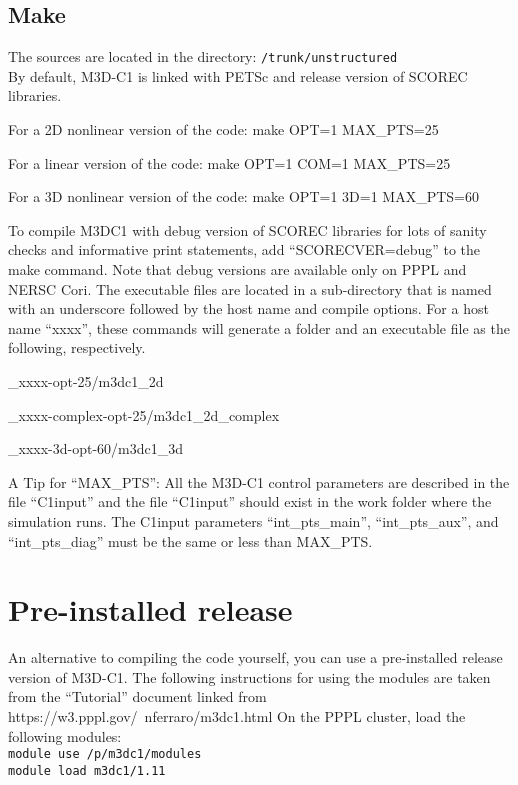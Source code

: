 \subsection{Make}
The sources are located in the directory: \texttt{/trunk/unstructured}
\\
By default, M3D-C1 is linked with PETSc and release version of SCOREC libraries.
\\
\begin{description}
\item 	For a 2D nonlinear version of the code:   	make OPT=1 MAX\_PTS=25
\item	For a linear version of the code:               		make OPT=1 COM=1 MAX\_PTS=25
\item	For a 3D nonlinear version of the code:     	make OPT=1 3D=1 MAX\_PTS=60
\end{description}
To compile M3DC1 with debug version of SCOREC libraries for lots of sanity checks and informative print statements, add “SCORECVER=debug” to the make command. Note that debug versions are available only on PPPL and NERSC Cori.
\newline\newline
The executable files are located in a sub-directory that is named with an underscore followed by the host name and compile options. For a host name “xxxx”, these commands will generate a folder and an executable file as the following, respectively.
\begin{description}
\item \_xxxx-opt-25/m3dc1\_2d
\item	\_xxxx-complex-opt-25/m3dc1\_2d\_complex
\item \_xxxx-3d-opt-60/m3dc1\_3d
\end{description}
A Tip for “MAX\_PTS”:  All the M3D-C1 control parameters are described in the file “C1input” and the file “C1input” should exist in the work folder where the simulation runs. The C1input parameters “int\_pts\_main”, “int\_pts\_aux”, and “int\_pts\_diag” must be the same or less than MAX\_PTS.

\section{Pre-installed release}
An alternative to compiling the code yourself, you can use a pre-installed release version of M3D-C1.    The following instructions for using the modules are taken from the “Tutorial” document linked from https://w3.pppl.gov/~nferraro/m3dc1.html
On the PPPL cluster, load the following modules:
\\
\texttt{module use /p/m3dc1/modules
\\
module load m3dc1/1.11
}

